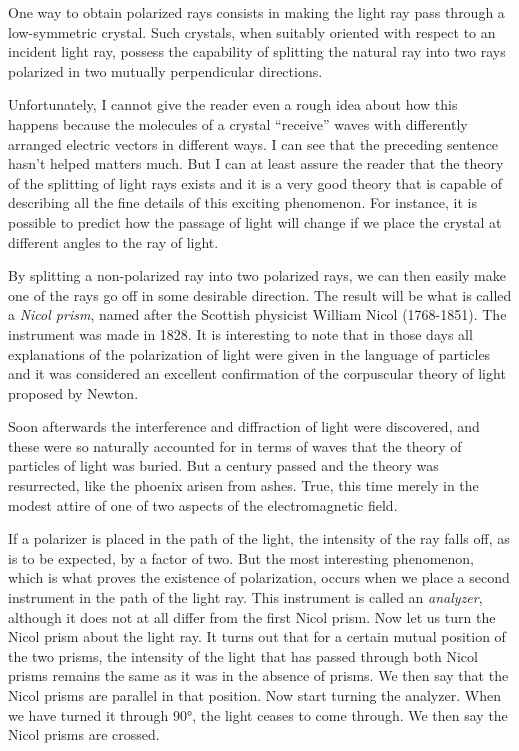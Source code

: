One way to obtain polarized rays consists in making the light ray pass through a low-symmetric crystal. Such crystals, when suitably oriented with respect to an inci­dent light ray, possess the capability of splitting the natural ray into two rays polarized in two mutually perpendicular directions.

Unfortunately, I cannot give the reader even a rough idea about how this happens because the molecules of a crystal ``receive'' waves with differently arranged electric vectors in different ways. I can see that the preceding sentence hasn’t helped matters much. But I can at least assure the reader that the theory of the splitting of light rays exists and it is a very good theory that is capable of describing all the fine details of this exciting phenom­enon. For instance, it is possible to predict how the passage of light will change if we place the crystal at different angles to the ray of light.

By splitting a non-polarized ray into two polarized rays, we can then easily make one of the rays go off in some desirable direction. The result will be what is called a \emph{Nicol prism}, named after the Scottish physicist William
Nicol (1768-1851). The instrument was made in 1828. It is interesting to note that in those days all explana­tions of the polarization of light were given in the language of particles and it was considered an excellent confirmation of the corpuscular theory of light proposed by Newton.

Soon afterwards the interference and diffraction of light were discovered, and these were so naturally accounted for in terms of waves that the theory of particles of light was buried. But a century passed and the theory was resurrected, like the phoenix arisen from ashes. True, this time merely in the modest attire of one of two as­pects of the electromagnetic field.

If a polarizer is placed in the path of the light, the intensity of the ray falls off, as is to be expected, by a factor of two. But the most interesting phenomenon, which is what proves the existence of polarization, occurs when we place a second instrument in the path of the light ray. This instrument is called an \emph{analyzer}, although it does not at all differ from the first Nicol prism. Now let us turn the Nicol prism about the light ray. It turns out that for a certain mutual position of the two prisms, the intensity of the light that has passed through both Nicol prisms remains the same as it was in the absence of prisms. We then say that the Nicol prisms are parallel in that position. Now start turning the analyzer. When we have turned it through \ang{90}, the light ceases to come through. We then say the Nicol prisms are crossed.

